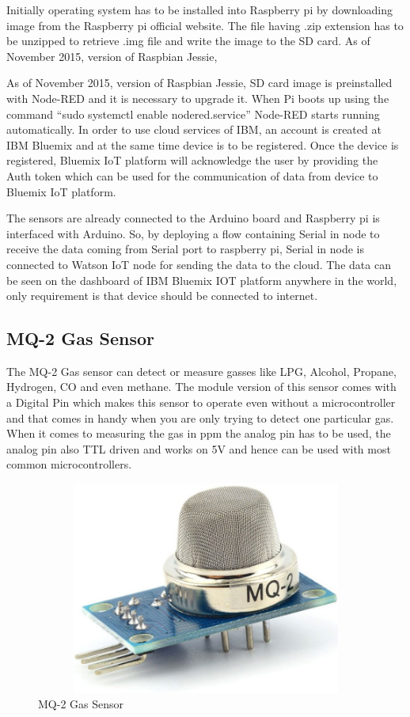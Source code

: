 Initially operating system has to be installed into Raspberry
pi by downloading image from the Raspberry pi official
website. The file having .zip extension has to be unzipped to
retrieve .img file and write the image to the SD card.
As of November 2015, version of Raspbian Jessie,

As of November 2015, version of Raspbian Jessie, SD card
image is preinstalled with Node-RED and it is necessary to
upgrade it. When Pi boots up using the command “sudo
systemctl enable nodered.service” Node-RED starts running
automatically. In order to use cloud services of IBM, an
account is created at IBM Bluemix and at the same time
device is to be registered. Once the device is registered,
Bluemix IoT platform will acknowledge the user by providing
the Auth token which can be used for the communication of
data from device to Bluemix IoT platform.

The sensors are already connected to the Arduino board
and Raspberry pi is interfaced with Arduino. So, by deploying
a flow containing Serial in node to receive the data coming
from Serial port to raspberry pi, Serial in node is connected to
Watson IoT node for sending the data to the cloud. The data
can be seen on the dashboard of IBM Bluemix IOT platform
anywhere in the world, only requirement is that device should
be connected to internet.

\subsection{MQ-2 Gas Sensor}

The MQ-2 Gas sensor can detect or measure gasses like LPG, Alcohol, Propane, Hydrogen, CO and even methane. The module version of this sensor comes with a Digital Pin which makes this sensor to operate even without a microcontroller and that comes in handy when you are only trying to detect one particular gas. When it comes to measuring the gas in ppm the analog pin has to be used, the analog pin also TTL driven and works on 5V and hence can be used with most common microcontrollers.

\begin{figure}[!ht]
\centering
\includegraphics[width=12cm,height=7cm]{figures/mq-2.jpg}
\caption{\label{img37} MQ-2 Gas Sensor}
\end{figure}

